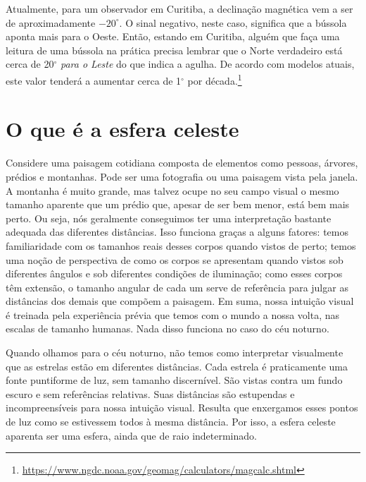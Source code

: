 Atualmente, para um observador em Curitiba, a declinação magnética vem a ser de aproximadamente $-20^{\circ}$. O sinal negativo, neste caso, significa que a bússola aponta mais para o Oeste. Então, estando em Curitiba, alguém que faça uma leitura de uma bússola na prática precisa lembrar que o Norte verdadeiro está cerca de 20$^{\circ}$ \textit{para o Leste} do que indica a agulha. De acordo com modelos atuais, este valor tenderá a aumentar cerca de 1$^{\circ}$ por década.\footnote{\url{https://www.ngdc.noaa.gov/geomag/calculators/magcalc.shtml}}


\section{O que é a esfera celeste}

Considere uma paisagem cotidiana composta de elementos como pessoas, árvores, prédios e montanhas. Pode ser uma fotografia ou uma paisagem vista pela janela. A montanha é muito grande, mas talvez ocupe no seu campo visual o mesmo tamanho aparente que um prédio que, apesar de ser bem menor, está bem mais perto. Ou seja, nós geralmente conseguimos ter uma interpretação bastante adequada das diferentes distâncias. Isso funciona graças a alguns fatores: temos familiaridade com os tamanhos reais desses corpos quando vistos de perto; temos uma noção de perspectiva de como os corpos se apresentam quando vistos sob diferentes ângulos e sob diferentes condições de iluminação; como esses corpos têm extensão, o tamanho angular de cada um serve de referência para julgar as distâncias dos demais que compõem a paisagem. Em suma, nossa intuição visual é treinada pela experiência prévia que temos com o mundo a nossa volta, nas escalas de tamanho humanas. Nada disso funciona no caso do céu noturno.

Quando olhamos para o céu noturno, não temos como interpretar visualmente que as estrelas estão em diferentes distâncias. Cada estrela é praticamente uma fonte puntiforme de luz, sem tamanho discernível. São vistas contra um fundo escuro e sem referências relativas. Suas distâncias são estupendas e incompreensíveis para nossa intuição visual. Resulta que enxergamos esses pontos de luz como se estivessem todos à mesma distância. Por isso, a esfera celeste aparenta ser uma esfera, ainda que de raio indeterminado.

